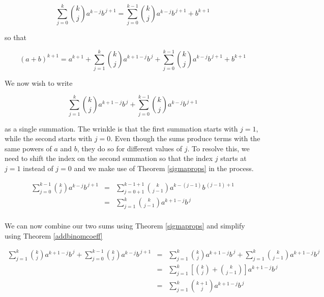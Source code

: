 \documentclass{ximera}
\begin{document}
\[ \displaystyle{\sum_{j=0}^{k} \binom{k}{j} a^{k-j} b^{\, j+1} = \sum_{j=0}^{k-1} \binom{k}{j} a^{k-j} b^{\, j+1} + b^{k+1}}\]

so that

\[ (a+b)^{k+1} = \displaystyle{a^{k+1} + \sum_{j=1}^{k} \binom{k}{j} a^{k+1-j} b^{\, j} + \sum_{j=0}^{k-1} \binom{k}{j} a^{k-j} b^{\, j+1}  + b^{k+1}}\]

We now wish to write

\[\displaystyle{\sum_{j=1}^{k} \binom{k}{j} a^{k+1-j} b^{\, j} + \sum_{j=0}^{k-1} \binom{k}{j} a^{k-j} b^{\, j+1}}\]

as a single summation.  The wrinkle is that the first summation starts with $j=1$, while the second starts with $j=0$. Even though the sums produce terms with the same powers of $a$ and $b$, they do so for different values of $j$.  To resolve this, we need to shift the index on the second summation so that the index $j$ starts at $j=1$ instead of $j=0$ and we make use of Theorem \ref{sigmaprops} in the process.

\[ \begin{array}{rcl}

\displaystyle{ \sum_{j=0}^{k-1} \binom{k}{j} a^{k-j} b^{\, j+1}} & = & \displaystyle{\sum_{j=0+1}^{k-1+1} \binom{k}{j-1} a^{k-(j-1)} b^{\, (j-1)+1}} \\[15pt]
                                                              & = & \displaystyle{\sum_{j=1}^{k} \binom{k}{j-1} a^{k+1-j} b^{\, j}} \\ [15pt] 
\end{array} \]

We can now combine our two sums using Theorem \ref{sigmaprops} and simplify using Theorem \ref{addbinomcoeff}

\[ \begin{array}{rcl}

\displaystyle{\sum_{j=1}^{k} \binom{k}{j} a^{k+1-j} b^{\, j} + \sum_{j=0}^{k-1} \binom{k}{j} a^{k-j} b^{\, j+1}} & = & \displaystyle{\sum_{j=1}^{k} \binom{k}{j} a^{k+1-j} b^{\, j} + \sum_{j=1}^{k} \binom{k}{j-1} a^{k+1-j} b^{\, j}} \\ [15pt] 

& = & \displaystyle{\sum_{j=1}^{k} \left[ \binom{k}{j} + \binom{k}{j-1} \right] a^{k+1-j} b^{\, j} } \\ [15pt]

& = & \displaystyle{\sum_{j=1}^{k} \binom{k+1}{j} a^{k+1-j} b^{\, j} } \\

\end{array} \]
\end{document}
